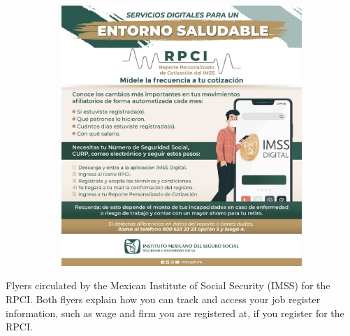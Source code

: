 \begin{figure}[H]
\begin{center}
\begin{subfigure}{0.49\textwidth}
    \includegraphics[width=\textwidth]{04_Figures/rpci_app/rpci_flyer_2.jpeg}
    \end{subfigure}

    \end{center}
\end{figure}
\scriptsize{
\noindent Flyers circulated by the Mexican Institute of Social Security (IMSS) for the RPCI. Both flyers explain how you can track and access your job register information, such as wage and firm you are registered at, if you register for the RPCI.
}

\clearpage

